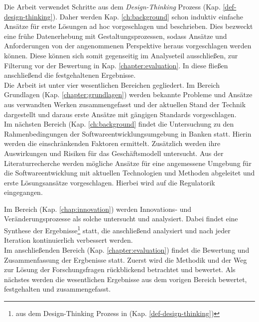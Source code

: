 Die Arbeit verwendet Schritte aus dem \emph{Design-Thinking} Prozess (Kap. \ref{def-design-thinking}). Daher werden Kap. \ref{ch:background} schon induktiv einfache Ansätze für erste Lösungen ad hoc vorgeschlagen und beschrieben. Dies bezweckt eine frühe Datenerhebung mit Gestaltungsprozessen, sodass Ansätze und Anforderungen von der angenommenen Perspektive heraus vorgeschlagen werden können. Diese können sich somit gegenseitig im Analyseteil ausschließen, zur Filterung vor der Bewertung in Kap. \ref{chapter:evaluation}. In diese fließen anschließend die festgehaltenen Ergebnisse.
\bigskip
\\
Die Arbeit ist unter vier wesentlichen Bereichen gegliedert. 
Im Bereich Grundlagen (Kap. \ref{chapter:grundlagen}) werden bekannte Probleme und Ansätze aus verwandten Werken zusammengefasst und der aktuellen Stand der Technik dargestellt und daraus erste Ansätze mit gängigen Standards vorgeschlagen. 
\medskip
\\
Im nächsten Bereich (Kap. \ref{ch:background} findet die Untersuchung zu den Rahmenbedingungen der Softwareentwicklungsumgebung in Banken statt. Hierin werden die einschränkenden Faktoren ermittelt. Zusätzlich werden ihre Auswirkungen und Risiken für das Geschäftsmodell untersucht. Aus der Literaturrecherche werden mögliche Ansätze für eine angemessene Umgebung für die Softwareentwicklung mit aktuellen Technologien und Methoden abgeleitet und erste Lösungsansätze vorgeschlagen. Hierbei wird auf die Regulatorik eingegangen. 

Im Bereich (Kap. \ref{chap:innovation}) werden Innovations- und Veränderungsprozesse als solche untersucht und analysiert. Dabei
findet eine Synthese der Ergebnisse\footnote{aus dem Design-Thinking Prozess in (Kap. \ref{def-design-thinking})} statt, die anschließend analysiert und nach jeder Iteration kontinuierlich verbessert werden.
\medskip
\\
Im anschließenden Bereich (Kap. \ref{chapter:evaluation}) findet die Bewertung und Zusammenfassung der Ergbenisse statt. Zuerst wird die Methodik und der Weg zur Lösung der Forschungsfragen rückblickend betrachtet und bewertet. Als nächstes werden die wesentlichen Ergebnisse aus dem vorigen Bereich bewertet, festgehalten und zusammengefasst.
